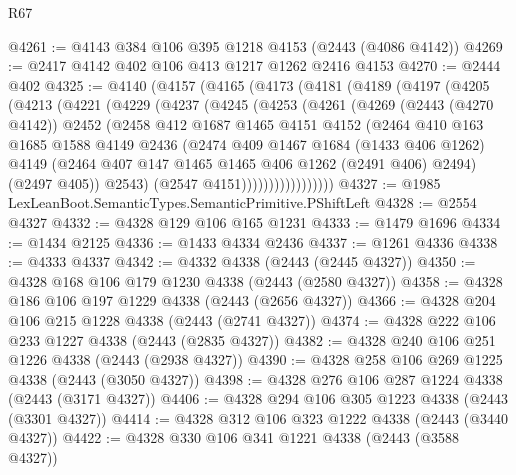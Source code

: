 \begin{lexlean}{R67}
\begin{coremodule}
@4261 := @4143 @384 @106 @395 @1218 @4153 (@2443 (@4086 @4142))
@4269 := @2417 @4142 @402 @106 @413 @1217 @1262 @2416 @4153
@4270 := @2444 @402
@4325 := @4140
    (@4157
      (@4165
        (@4173
          (@4181
            (@4189
              (@4197
                (@4205
                  (@4213
                    (@4221
                      (@4229
                        (@4237
                          (@4245
                            (@4253
                              (@4261
                                (@4269
                                  (@2443 (@4270 @4142))
                                  @2452
                                  (@2458
                                    @412
                                    @1687
                                    @1465
                                    @4151
                                    @4152
                                    (@2464
                                      @410
                                      @163
                                      @1685
                                      @1588
                                      @4149
                                      @2436
                                      (@2474
                                        @409
                                        @1467
                                        @1684
                                        (@1433 @406 @1262)
                                        @4149
                                        (@2464 @407 @147 @1465 @1465 @406 @1262 (@2491 @406) @2494)
                                        (@2497 @405))
                                      @2543)
                                    (@2547 @4151)))))))))))))))))
@4327 := @1985 LexLeanBoot.SemanticTypes.SemanticPrimitive.PShiftLeft
@4328 := @2554 @4327
@4332 := @4328 @129 @106 @165 @1231
@4333 := @1479 @1696
@4334 := @1434 @2125
@4336 := @1433 @4334 @2436
@4337 := @1261 @4336
@4338 := @4333 @4337
@4342 := @4332 @4338 (@2443 (@2445 @4327))
@4350 := @4328 @168 @106 @179 @1230 @4338 (@2443 (@2580 @4327))
@4358 := @4328 @186 @106 @197 @1229 @4338 (@2443 (@2656 @4327))
@4366 := @4328 @204 @106 @215 @1228 @4338 (@2443 (@2741 @4327))
@4374 := @4328 @222 @106 @233 @1227 @4338 (@2443 (@2835 @4327))
@4382 := @4328 @240 @106 @251 @1226 @4338 (@2443 (@2938 @4327))
@4390 := @4328 @258 @106 @269 @1225 @4338 (@2443 (@3050 @4327))
@4398 := @4328 @276 @106 @287 @1224 @4338 (@2443 (@3171 @4327))
@4406 := @4328 @294 @106 @305 @1223 @4338 (@2443 (@3301 @4327))
@4414 := @4328 @312 @106 @323 @1222 @4338 (@2443 (@3440 @4327))
@4422 := @4328 @330 @106 @341 @1221 @4338 (@2443 (@3588 @4327))

\end{coremodule}
\end{lexlean}
